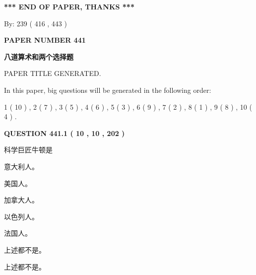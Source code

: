 \documentclass{ctexart}
\begin{document}
   
   
   
\vspace{1.0in} 
{\textbf{\large{ *** END OF PAPER, THANKS *** }}} 
   
   
\hspace{1.0in} By: 
 239 ( 416 ,  443 )
   
   
   
   
\newpage 
\setcounter{page}{ 
   441001 } 
   
   
   
   
 {\textbf{ \Large{ PAPER NUMBER  441  }}}
   
   
\vspace{0.2in}
   
   
   
   
   
   
   
   
 \vspace{0.2in}
{\LARGE {\textbf{ 八道算术和两个选择题}}}
   
   
 PAPER TITLE GENERATED.
   
   
   
\vspace{0.2in}
   
In this paper, big questions will be generated in the following order: 
   
   
   1 ( 10 )
 ,
   2 ( 7 )
 ,
   3 ( 5 )
 ,
   4 ( 6 )
 ,
   5 ( 3 )
 ,
   6 ( 9 )
 ,
   7 ( 2 )
 ,
   8 ( 1 )
 ,
   9 ( 8 )
 ,
   10 ( 4 )
 .
  
\vspace{0.2in}
  
{\textbf{\Large{QUESTION
441.1 
 ( 10 , 10 , 202 )
}}}
  
  
科学巨匠牛顿是
 
 
意大利人。
 
 
美国人。
 
 
加拿大人。
 
 
以色列人。
 
 
法国人。
 
 
 上述都不是。
 
 
\noindent{}
 
 
 上述都不是。
 
\end{document}
